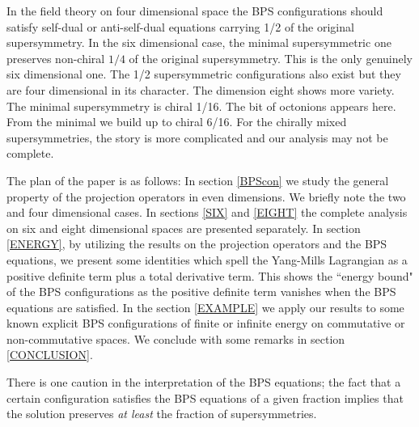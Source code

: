 \documentclass[a4paper,11pt]{article}
\begin{document}
In the field theory on four dimensional space the BPS configurations should satisfy self-dual or anti-self-dual equations carrying 1/2 of the
original supersymmetry.  In the six dimensional case, the minimal  supersymmetric one preserves non-chiral $1/4$ of the original supersymmetry. This
is the only genuinely six dimensional one. The 1/2 supersymmetric configurations also exist but they are four dimensional in its character. The
dimension eight shows more variety. The minimal supersymmetry is chiral 1/16. The bit of octonions appears here.  From the minimal we build up to
chiral 6/16. For the chirally mixed supersymmetries, the story is more complicated and our analysis may not be complete.





The plan of the paper is as follows: In section \ref{BPScon} we study the general property of the projection operators in even dimensions. We briefly
note the two and four dimensional cases.  In sections \ref{SIX} and \ref{EIGHT} the complete analysis on  six and eight dimensional spaces are
presented separately.   In section \ref{ENERGY}, by utilizing the results on the projection operators and the BPS equations, we present some
identities which spell the Yang-Mills Lagrangian as a positive definite term plus a total derivative term. This shows the ``energy bound" of the BPS
configurations as the positive definite term vanishes when the BPS equations are satisfied. In the section \ref{EXAMPLE} we apply our results to
some known explicit BPS configurations of finite or infinite energy on commutative or non-commutative spaces. We conclude with some remarks in
section \ref{CONCLUSION}.



There is one caution in the interpretation of the BPS equations; the fact that a certain configuration  satisfies the BPS equations of a given
fraction implies that the solution preserves {\it at least} the fraction of supersymmetries.
\newpage

\end{document}
